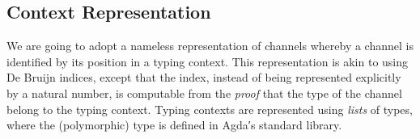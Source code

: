 \begin{code}[hide]%
\>[0]\AgdaSpace{}%
\AgdaSpace{}%
\AgdaSpace{}%
\AgdaSpace{}%
\AgdaSymbol{(}\AgdaSymbol{;}\AgdaSpace{}%
\AgdaSymbol{;}\AgdaSpace{}%
\AgdaSymbol{;}\AgdaSpace{}%
\AgdaSymbol{)}\<%
\\
\>[0]\AgdaSpace{}%
\AgdaSpace{}%
\AgdaSpace{}%
\AgdaSpace{}%
\AgdaSymbol{(}\AgdaSymbol{;}\AgdaSpace{}%
\AgdaOperator{\AgdaInductiveConstructor{\AgdaUnderscore{},\AgdaUnderscore{}}}\AgdaSymbol{;}\AgdaSpace{}%
\AgdaSymbol{;}\AgdaSpace{}%
\AgdaSymbol{)}\<%
\\
\>[0]\AgdaSpace{}%
\AgdaSpace{}%
\AgdaSpace{}%
\AgdaSpace{}%
\AgdaSymbol{(}\AgdaSymbol{;}\AgdaSpace{}%
\AgdaSymbol{;}\AgdaSpace{}%
\AgdaSymbol{;}\AgdaSpace{}%
\AgdaSymbol{)}\<%
\\
\>[0]\AgdaSpace{}%
\AgdaSpace{}%
\AgdaSpace{}%
\AgdaSpace{}%
\AgdaSymbol{(}\AgdaSymbol{;}\AgdaSpace{}%
\AgdaInductiveConstructor{[]}\AgdaSymbol{;}\AgdaSpace{}%
\AgdaSymbol{;}\AgdaSpace{}%
\AgdaOperator{\AgdaFunction{[\AgdaUnderscore{}]}}\AgdaSymbol{;}\AgdaSpace{}%
\AgdaOperator{\AgdaFunction{\AgdaUnderscore{}++\AgdaUnderscore{}}}\AgdaSymbol{)}\<%
\\
%
\\[\AgdaEmptyExtraSkip]%
\>[0]\AgdaSpace{}%
\AgdaSpace{}%
\<%
\end{code}

\subsection{Context Representation}
\label{sec:context-agda}

We are going to adopt a nameless representation of channels whereby a channel is
identified by its position in a typing context. This representation is akin to
using De Bruijn indices, except that the index, instead of being represented
explicitly by a natural number, is computable from the \emph{proof} that the
type of the channel belong to the typing context.
%
Typing contexts are represented using \emph{lists} of types, where the
(polymorphic)  type is defined in Agda′s standard library.

